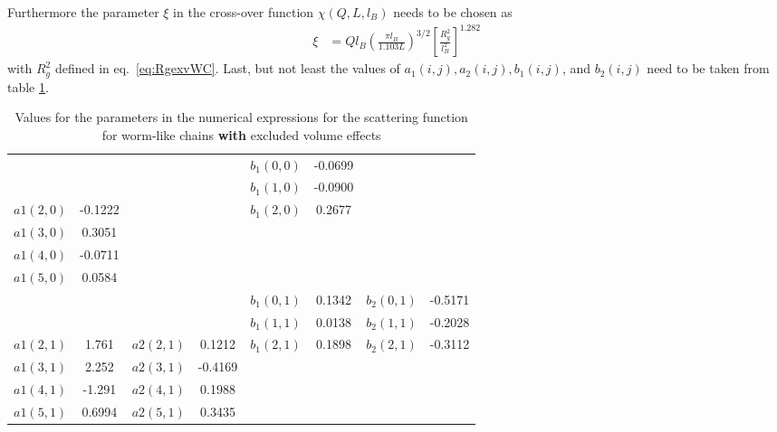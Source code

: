 Furthermore the parameter $\xi$ in the cross-over function $\chi(Q,L,l_B)$ needs to be chosen as
\begin{align}
\xi&=Ql_B\left(\frac{\pi l_B}{1.103 L}\right)^{3/2}\left[\frac{R_g^2}{l_B^2}\right]^{1.282}
\end{align}
with $R_g^2$ defined in eq.\ \ref{eq:RgexvWC}. Last, but not least the values of $a_1(i,j), a_2(i,j), b_1(i,j)$, and $b_2(i,j)$ need to be taken from table \ref{table:numValWMPS1withexv}.
\begin{table}
  \caption{Values for the parameters in the numerical expressions for the scattering function for worm-like chains \textbf{with} excluded volume effects \cite{Pedersen96Macrom}}
  \label{table:numValWMPS1withexv}
  \centering
  \begin{tabular}{l c|l c|l c|l c}
     \hline
               &          &           &          & $b_1(0,0)$ & -0.0699  &            &          \\
               &          &           &          & $b_1(1,0)$ & -0.0900  &            &          \\
     $a1(2,0)$ & -0.1222  &           &          & $b_1(2,0)$ &  0.2677  &            &          \\
     $a1(3,0)$ &  0.3051  &           &          &            &          &            &          \\
     $a1(4,0)$ & -0.0711  &           &          &            &          &            &          \\
     $a1(5,0)$ &  0.0584  &           &          &            &          &            &          \\
               &          &           &          & $b_1(0,1)$ &  0.1342  & $b_2(0,1)$ & -0.5171  \\
               &          &           &          & $b_1(1,1)$ &  0.0138  & $b_2(1,1)$ & -0.2028  \\
     $a1(2,1)$ &  1.761   & $a2(2,1)$ &  0.1212  & $b_1(2,1)$ &  0.1898  & $b_2(2,1)$ & -0.3112  \\
     $a1(3,1)$ &  2.252   & $a2(3,1)$ & -0.4169  &            &          &            &          \\
     $a1(4,1)$ & -1.291   & $a2(4,1)$ &  0.1988  &            &          &            &          \\
     $a1(5,1)$ &  0.6994  & $a2(5,1)$ &  0.3435  &            &          &            &          \\

\end{tabular}
\end{table}
